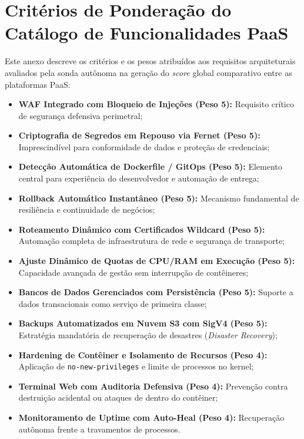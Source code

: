 
\section{Critérios de Ponderação do Catálogo de Funcionalidades PaaS}
\label{anx:anexo-b}

Este anexo descreve os critérios e os pesos atribuídos aos requisitos arquiteturais avaliados pela sonda autônoma na geração do \textit{score} global comparativo entre as plataformas PaaS:

\begin{itemize}
    \item \textbf{WAF Integrado com Bloqueio de Injeções (Peso 5):} Requisito crítico de segurança defensiva perimetral;
    \item \textbf{Criptografia de Segredos em Repouso via Fernet (Peso 5):} Imprescindível para conformidade de dados e proteção de credenciais;
    \item \textbf{Detecção Automática de Dockerfile / GitOps (Peso 5):} Elemento central para experiência do desenvolvedor e automação de entrega;
    \item \textbf{Rollback Automático Instantâneo (Peso 5):} Mecanismo fundamental de resiliência e continuidade de negócios;
    \item \textbf{Roteamento Dinâmico com Certificados Wildcard (Peso 5):} Automação completa de infraestrutura de rede e segurança de transporte;
    \item \textbf{Ajuste Dinâmico de Quotas de CPU/RAM em Execução (Peso 5):} Capacidade avançada de gestão sem interrupção de contêineres;
    \item \textbf{Bancos de Dados Gerenciados com Persistência (Peso 5):} Suporte a dados transacionais como serviço de primeira classe;
    \item \textbf{Backups Automatizados em Nuvem S3 com SigV4 (Peso 5):} Estratégia mandatória de recuperação de desastres (\textit{Disaster Recovery});
    \item \textbf{Hardening de Contêiner e Isolamento de Recursos (Peso 4):} Aplicação de \texttt{no-new-privileges} e limite de processos no kernel;
    \item \textbf{Terminal Web com Auditoria Defensiva (Peso 4):} Prevenção contra destruição acidental ou ataques de dentro do contêiner;
    \item \textbf{Monitoramento de Uptime com Auto-Heal (Peso 4):} Recuperação autônoma frente a travamentos de processos.
\end{itemize}
